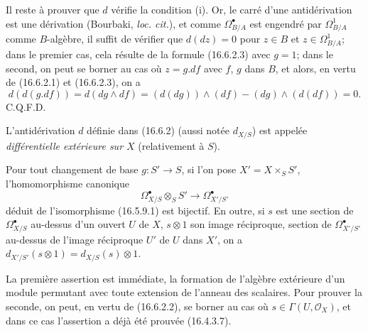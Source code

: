 Il reste à prouver que $d$ vérifie la condition (i). Or, le carré d'une
antidérivation est une dérivation (Bourbaki, \emph{loc. cit.}), et comme
$\Omega_{B/A}^{\bullet}$ est engendré par $\Omega_{B/A}^1$ comme
$B$-algèbre, il suffit de vérifier que $d(dz)=0$ pour $z\in B$ et
$z\in\Omega_{B/A}^1$; dans le premier cas, cela résulte de la formule
(16.6.2.3) avec $g=1$; dans le second, on peut se borner au cas où $z=g.df$
avec $f$, $g$ dans $B$, et alors, en vertu de (16.6.2.1) et (16.6.2.3), on a
\[
  d(d(g.df))=d(dg\wedge df)
  =(d(dg))\wedge(df)-(dg)\wedge(d(df))=0.
\]
\hfill C.Q.F.D.

\begin{definition}[16.6.3]
\label{IV.16.6.3}
L'antidérivation $d$ définie dans (16.6.2) (aussi notée $d_{X/S}$) est
appelée \emph{différentielle extérieure sur $X$} (relativement à $S$).
\end{definition}

\begin{proposition}[16.6.4]
\label{IV.16.6.4}
Pour tout changement de base $g:S'\to S$, si l'on pose
$X'=X\times_S S'$, l'homomorphisme canonique
\[
  \Omega_{X/S}^{\bullet}\otimes_S S'
  \longrightarrow\Omega_{X'/S'}^{\bullet}
  \tag{16.6.4.1}
  \label{IV.16.6.4.1}
\]
déduit de l'isomorphisme (16.5.9.1) est bijectif. En outre, si $s$ est une
section de $\Omega_{X/S}^{\bullet}$ au-dessus d'un ouvert $U$ de $X$,
$s\otimes1$ son image réciproque, section de $\Omega_{X'/S'}^{\bullet}$
au-dessus de l'image réciproque $U'$ de $U$ dans $X'$, on a
$d_{X'/S'}(s\otimes1)=d_{X/S}(s)\otimes1$.
\end{proposition}

La première assertion est immédiate, la formation de l'algèbre extérieure
d'un module permutant avec toute extension de l'anneau des scalaires. Pour
prouver la seconde, on peut, en vertu de (16.6.2.2), se borner au cas où
$s\in\Gamma(U,\mathcal{O}_X)$, et dans ce cas l'assertion a déjà été prouvée
(16.4.3.7).

